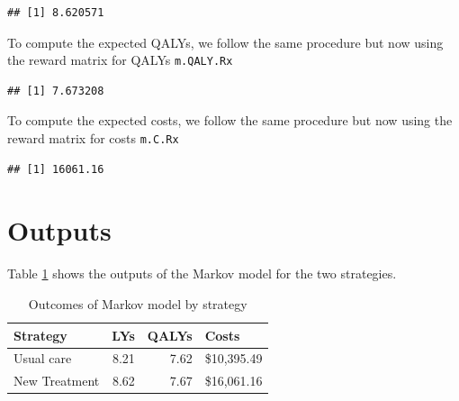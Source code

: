 \documentclass[]{article}
\newenvironment{Shaded}{\begin{snugshade}}{\end{snugshade}}
\newcommand{\KeywordTok}[1]{\textcolor[rgb]{0.13,0.29,0.53}{\textbf{#1}}}
\newcommand{\DataTypeTok}[1]{\textcolor[rgb]{0.13,0.29,0.53}{#1}}
\newcommand{\StringTok}[1]{\textcolor[rgb]{0.31,0.60,0.02}{#1}}
\newcommand{\OperatorTok}[1]{\textcolor[rgb]{0.81,0.36,0.00}{\textbf{#1}}}
\newcommand{\NormalTok}[1]{#1}
\theoremstyle{definition}
\theoremstyle{definition}
\theoremstyle{definition}
\theoremstyle{remark}
\begin{document}
\begin{verbatim}
## [1] 8.620571
\end{verbatim}

To compute the expected QALYs, we follow the same procedure but now
using the reward matrix for QALYs \texttt{m.QALY.Rx}

\begin{Shaded}
\end{Shaded}

\begin{verbatim}
## [1] 7.673208
\end{verbatim}

To compute the expected costs, we follow the same procedure but now
using the reward matrix for costs \texttt{m.C.Rx}

\begin{Shaded}
\end{Shaded}

\begin{verbatim}
## [1] 16061.16
\end{verbatim}

\section{Outputs}\label{outputs}

Table \ref{tab:Output} shows the outputs of the Markov model for the two
strategies.

\begin{table}[!h]

\caption{\label{tab:Output}Outcomes of Markov model by strategy}
\centering
\begin{tabular}[t]{lrrl}
\toprule
Strategy & LYs & QALYs & Costs\\
\midrule
Usual care & 8.21 & 7.62 & \$10,395.49\\
New Treatment & 8.62 & 7.67 & \$16,061.16\\
\bottomrule
\end{tabular}
\end{table}
\end{document}
